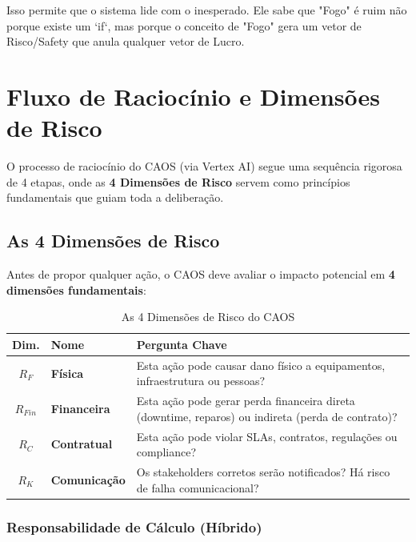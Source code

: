 \documentclass[12pt, a4paper]{article}
\begin{document}
Isso permite que o sistema lide com o inesperado. Ele sabe que "Fogo" é ruim não porque existe um `if`, mas porque o conceito de "Fogo" gera um vetor de Risco/Safety que anula qualquer vetor de Lucro.

\newpage

\section{Fluxo de Raciocínio e Dimensões de Risco}
\label{sec:risk_dimensions}

O processo de raciocínio do CAOS (via Vertex AI) segue uma sequência rigorosa de 4 etapas, onde as \textbf{4 Dimensões de Risco} servem como princípios fundamentais que guiam toda a deliberação.

\subsection{As 4 Dimensões de Risco}

Antes de propor qualquer ação, o CAOS deve avaliar o impacto potencial em \textbf{4 dimensões fundamentais}:

\begin{table}[h!]
\centering
\begin{tabular}{|c|l|p{8cm}|}
\hline
\textbf{Dim.} & \textbf{Nome} & \textbf{Pergunta Chave} \\ \hline
$R_F$ & \textbf{Física} & Esta ação pode causar dano físico a equipamentos, infraestrutura ou pessoas? \\ \hline
$R_{Fin}$ & \textbf{Financeira} & Esta ação pode gerar perda financeira direta (downtime, reparos) ou indireta (perda de contrato)? \\ \hline
$R_C$ & \textbf{Contratual} & Esta ação pode violar SLAs, contratos, regulações ou compliance? \\ \hline
$R_K$ & \textbf{Comunicação} & Os stakeholders corretos serão notificados? Há risco de falha comunicacional? \\ \hline
\end{tabular}
\caption{As 4 Dimensões de Risco do CAOS}
\label{tab:risk_dimensions}
\end{table}

\subsubsection{Responsabilidade de Cálculo (Híbrido)}
\end{document}
